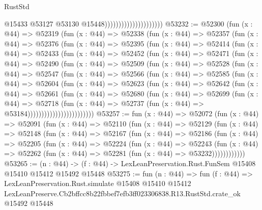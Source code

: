\begin{lexlean}{RustStd}
\begin{coremodule}
                                              @15433
                                              @53127
                                              @53130
                                              @15448)))))))))))))))))))))
@53232 := @52300
    (fun (x : @44) =>
    @52319
      (fun (x : @44) =>
      @52338
        (fun (x : @44) =>
        @52357
          (fun (x : @44) =>
          @52376
            (fun (x : @44) =>
            @52395
              (fun (x : @44) =>
              @52414
                (fun (x : @44) =>
                @52433
                  (fun (x : @44) =>
                  @52452
                    (fun (x : @44) =>
                    @52471
                      (fun (x : @44) =>
                      @52490
                        (fun (x : @44) =>
                        @52509
                          (fun (x : @44) =>
                          @52528
                            (fun (x : @44) =>
                            @52547
                              (fun (x : @44) =>
                              @52566
                                (fun (x : @44) =>
                                @52585
                                  (fun (x : @44) =>
                                  @52604
                                    (fun (x : @44) =>
                                    @52623
                                      (fun (x : @44) =>
                                      @52642
                                        (fun (x : @44) =>
                                        @52661
                                          (fun (x : @44) =>
                                          @52680
                                            (fun (x : @44) =>
                                            @52699
                                              (fun (x : @44) =>
                                              @52718
                                                (fun (x : @44) =>
                                                @52737
                                                  (fun (x : @44) => @53184))))))))))))))))))))))))
@53257 := fun (x : @44) =>
  @52072
    (fun (x : @44) =>
    @52091
      (fun (x : @44) =>
      @52110
        (fun (x : @44) =>
        @52129
          (fun (x : @44) =>
          @52148
            (fun (x : @44) =>
            @52167
              (fun (x : @44) =>
              @52186
                (fun (x : @44) =>
                @52205
                  (fun (x : @44) =>
                  @52224
                    (fun (x : @44) =>
                    @52243
                      (fun (x : @44) =>
                      @52262 (fun (x : @44) => @52281 (fun (x : @44) => @53232))))))))))))
@53265 := (n : @44) ->
  (f : @44) -> LexLeanPreservation.Rust.FunSem @15408 @15410 @15412 @15492 @15448
@53275 := fun (n : @44) =>
  fun (f : @44) =>
  LexLeanPreservation.Rust.simulate
    @15408
    @15410
    @15412
    LexLeanPreserve.Cb2bffcc8b22fbbef7efb3ff023306838.R13.RustStd.crate_ok
    @15492
    @15448
\end{coremodule}
\end{lexlean}
